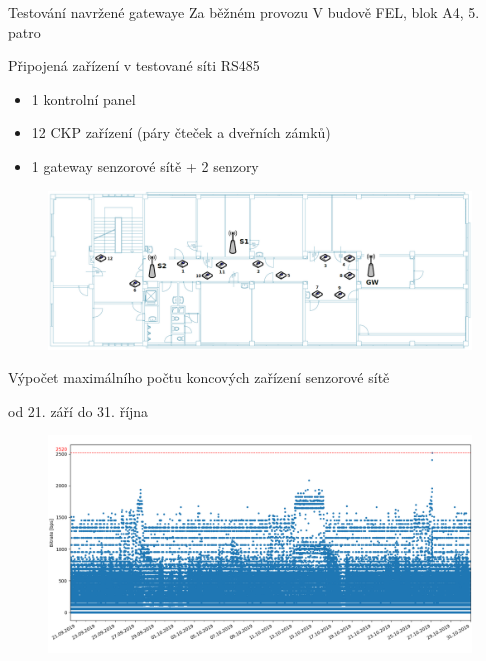 \documentclass{beamer}
\begin{document}
\begin{frame} {Testování navržené gatewaye}
	Za běžném provozu
	V budově FEL, blok A4, 5. patro

	Připojená zařízení v testované síti RS485
	\begin{itemize}
		\item 1 kontrolní panel
		\item 12 CKP zařízení (páry čteček a dveřních zámků)
		\item 1 gateway senzorové sítě + 2 senzory
	\end{itemize}

	\begin{figure}[!h]
		\centering
		\includegraphics[width=1\textwidth]{5patro}
	\end{figure}

\end{frame}


\begin{frame} {Výpočet maximálního počtu koncových zařízení senzorové sítě}

	od 21. září do 31. října

	\begin{figure}[!h]
		\centering
		\includegraphics[width=1\textwidth]{03-dr-measured}
	\end{figure}





	
\end{frame}
\end{document}
